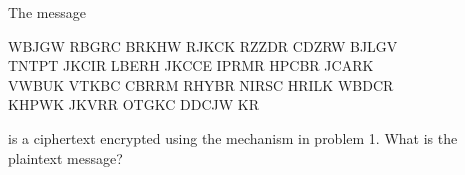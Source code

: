 \documentclass{my-cls}
\begin{document}
\begin{problem}[2.3]
The message

\smallskip

WBJGW RBGRC BRKHW RJKCK RZZDR CDZRW BJLGV\\
TNTPT JKCIR LBERH JKCCE IPRMR HPCBR JCARK\\
VWBUK VTKBC CBRRM RHYBR NIRSC HRILK WBDCR\\
KHPWK JKVRR OTGKC DDCJW KR

\smallskip

is a ciphertext encrypted using the mechanism in problem 1. What is the plaintext
message?
\end{problem}


\end{document}
